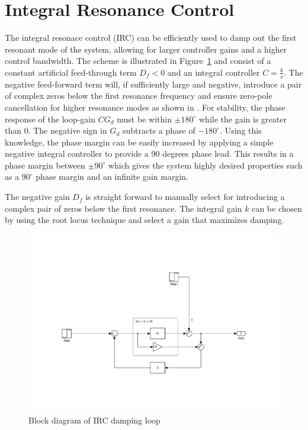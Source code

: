 \section{Integral Resonance Control}\label{sec:irc}
The integral resonace control (IRC) can be efficiently used to damp out the first resonant mode of the system, allowing for larger controller gains and a higher control bandwidth. The \abbrIRC scheme is illustrated in Figure~\ref{fig:irc} and consist of a constant artificial feed-through term $D_f<0$ and an integral controller $C=\frac{k}{s}$. The negative feed-forward term will, if sufficiently large and negative, introduce a pair of complex zeros below the first resonance frequency and ensure zero-pole cancellation for higher resonance modes as shown in \citep{Aphale:2007}. For stability, the phase response of the loop-gain $CG_d$ must be within $\pm180^{\circ}$ while the gain is greater than 0. The negative sign in $G_d$ subtracts a phase of $-180^{\circ}$. Using this knowledge, the phase margin can be easily increased by applying a simple negative integral controller to provide a 90 degrees phase lead. This results in a phase margin between  $\pm90^{\circ}$ which gives the system highly desired properties such as a $90^{\circ}$ phase margin and an infinite gain margin.

The negative gain $D_f$ is straight forward to manually select for introducing a complex pair of zeros below the first resonance. The integral gain $k$ can be chosen by using the root locus technique and select a gain that maximizes damping.

\begin{figure}[h]
  \centering %
  \includegraphics[width=1\textwidth, trim=5.5cm 3cm 5.1cm 9.5cm, clip=true]{fig/matlab/irc}
  \caption{\label{fig:irc}Block diagram of IRC damping loop}
\end{figure}

